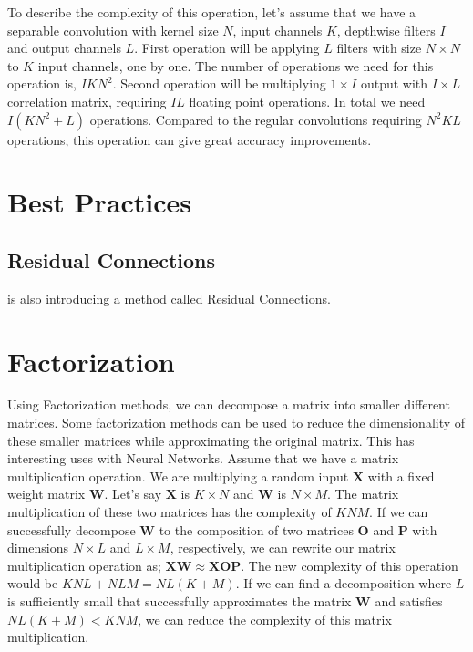 To describe the complexity of this operation, let's assume that we have a separable convolution with kernel size $N$, input channels $K$, depthwise filters $I$ and output channels $L$. First operation will be applying $L$ filters with size $N \times N$ to $K$ input channels, one by one. The number of operations we need for this operation is, $IKN^2$. Second operation will be multiplying $1 \times I$ output with $I \times L$ correlation matrix, requiring $IL$ floating point operations. In total we need $I(KN^2+L)$ operations. Compared to the regular convolutions requiring $N^2KL$ operations, this operation can give great accuracy improvements. 
\section{Best Practices}
\subsection{Residual Connections}

\cite{He:2015aa} is also introducing a method called Residual Connections.
\section{Factorization}
Using Factorization methods, we can decompose a matrix into smaller different matrices. Some factorization methods can be used to reduce the dimensionality of these smaller matrices while approximating the original matrix. This has interesting uses with Neural Networks. Assume that we have a matrix multiplication operation. We are multiplying a random input $\mathbf{X}$ with a fixed weight matrix $\mathbf{W}$. Let's say $\mathbf{X}$ is $K \times N$ and $\mathbf{W}$ is $N \times M$. The matrix multiplication of these two matrices has the complexity of $KNM$. If we can successfully decompose $\mathbf{W}$ to the composition of two matrices $\mathbf{O}$ and $\mathbf{P}$ with dimensions $N \times L$ and $L \times M$, respectively, we can rewrite our matrix multiplication operation as; $\mathbf{X}\mathbf{W} \approx \mathbf{X}\mathbf{O}\mathbf{P}$. The new complexity of this operation would be $KNL + NLM = NL(K+M)$. If we can find a decomposition where $L$ is sufficiently small that successfully approximates the matrix $\mathbf{W}$ and satisfies $NL(K+M) < KNM$, we can reduce the complexity of this matrix multiplication.
